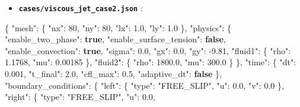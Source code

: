 \documentclass[
  10pt,
]{article}
\newenvironment{Shaded}{}{}
\newcommand{\DataTypeTok}[1]{\textcolor[rgb]{0.56,0.13,0.00}{#1}}
\newcommand{\DecValTok}[1]{\textcolor[rgb]{0.25,0.63,0.44}{#1}}
\newcommand{\FloatTok}[1]{\textcolor[rgb]{0.25,0.63,0.44}{#1}}
\newcommand{\FunctionTok}[1]{\textcolor[rgb]{0.02,0.16,0.49}{#1}}
\newcommand{\KeywordTok}[1]{\textcolor[rgb]{0.00,0.44,0.13}{\textbf{#1}}}
\newcommand{\StringTok}[1]{\textcolor[rgb]{0.25,0.44,0.63}{#1}}
\providecommand{\tightlist}{%
  \setlength{\itemsep}{0pt}\setlength{\parskip}{0pt}}
\begin{document}
\begin{itemize}
\tightlist
\item
  \textbf{\texttt{cases/viscous\_jet\_case2.json}} :
\end{itemize}

\begin{Shaded}
\begin{Highlighting}[]
\FunctionTok{\{}
  \DataTypeTok{"mesh"}\FunctionTok{:} \FunctionTok{\{}
    \DataTypeTok{"nx"}\FunctionTok{:} \DecValTok{80}\FunctionTok{,}
    \DataTypeTok{"ny"}\FunctionTok{:} \DecValTok{80}\FunctionTok{,}
    \DataTypeTok{"lx"}\FunctionTok{:} \FloatTok{1.0}\FunctionTok{,}
    \DataTypeTok{"ly"}\FunctionTok{:} \FloatTok{1.0}
  \FunctionTok{\},}
  \DataTypeTok{"physics"}\FunctionTok{:} \FunctionTok{\{}
    \DataTypeTok{"enable\_two\_phase"}\FunctionTok{:} \KeywordTok{true}\FunctionTok{,}
    \DataTypeTok{"enable\_surface\_tension"}\FunctionTok{:} \KeywordTok{false}\FunctionTok{,}
    \DataTypeTok{"enable\_convection"}\FunctionTok{:} \KeywordTok{true}\FunctionTok{,}
    \DataTypeTok{"sigma"}\FunctionTok{:} \FloatTok{0.0}\FunctionTok{,}
    \DataTypeTok{"gx"}\FunctionTok{:} \FloatTok{0.0}\FunctionTok{,}
    \DataTypeTok{"gy"}\FunctionTok{:} \FloatTok{{-}9.81}\FunctionTok{,}
    \DataTypeTok{"fluid1"}\FunctionTok{:} \FunctionTok{\{}
      \DataTypeTok{"rho"}\FunctionTok{:} \FloatTok{1.1768}\FunctionTok{,}
      \DataTypeTok{"mu"}\FunctionTok{:} \FloatTok{0.00185}
    \FunctionTok{\},}
    \DataTypeTok{"fluid2"}\FunctionTok{:} \FunctionTok{\{}
      \DataTypeTok{"rho"}\FunctionTok{:} \FloatTok{1800.0}\FunctionTok{,}
      \DataTypeTok{"mu"}\FunctionTok{:} \FloatTok{300.0}
    \FunctionTok{\}}
  \FunctionTok{\},}
  \DataTypeTok{"time"}\FunctionTok{:} \FunctionTok{\{}
    \DataTypeTok{"dt"}\FunctionTok{:} \FloatTok{0.001}\FunctionTok{,}
    \DataTypeTok{"t\_final"}\FunctionTok{:} \FloatTok{2.0}\FunctionTok{,}
    \DataTypeTok{"cfl\_max"}\FunctionTok{:} \FloatTok{0.5}\FunctionTok{,}
    \DataTypeTok{"adaptive\_dt"}\FunctionTok{:} \KeywordTok{false}
  \FunctionTok{\},}
  \DataTypeTok{"boundary\_conditions"}\FunctionTok{:} \FunctionTok{\{}
    \DataTypeTok{"left"}\FunctionTok{:} \FunctionTok{\{}
      \DataTypeTok{"type"}\FunctionTok{:} \StringTok{"FREE\_SLIP"}\FunctionTok{,}
      \DataTypeTok{"u"}\FunctionTok{:} \FloatTok{0.0}\FunctionTok{,}
      \DataTypeTok{"v"}\FunctionTok{:} \FloatTok{0.0}
    \FunctionTok{\},}
    \DataTypeTok{"right"}\FunctionTok{:} \FunctionTok{\{}
      \DataTypeTok{"type"}\FunctionTok{:} \StringTok{"FREE\_SLIP"}\FunctionTok{,}
      \DataTypeTok{"u"}\FunctionTok{:} \FloatTok{0.0}\FunctionTok{,}

\end{Highlighting}
\end{Shaded}
\end{document}
